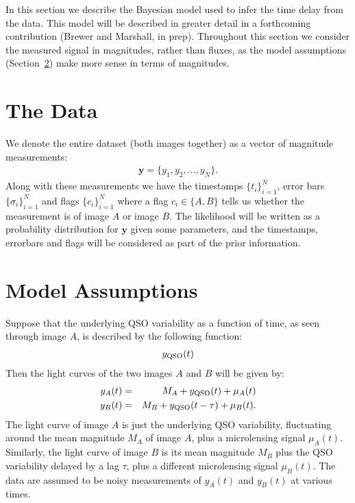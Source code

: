 \documentclass[a4paper, 10pt]{article}
\title{}
\author{}
\date{} %
\newcommand{\yy}{\mathbf{y}}
\begin{document}
In this section we describe the Bayesian model used to infer the
time delay from the data. This model will be described in greater detail in
a forthcoming contribution (Brewer and Marshall, in prep).
Throughout this section we consider the measured signal in magnitudes,
rather than fluxes, as the model assumptions (Section~\ref{sec:assumptions})
make more sense in terms of magnitudes.

\section{The Data}
We denote the entire dataset (both images together)
as a vector of magnitude measurements:
\begin{eqnarray}
\yy = \{y_1, y_2, ..., y_N\}.
\end{eqnarray}
Along with these measurements we have the timestamps $\{t_i\}_{i=1}^N$,
error bars $\{\sigma_i\}_{i=1}^N$ and flags
$\{c_i\}_{i=1}^N$ where a flag $c_i \in \{A, B\}$ tells us whether the
measurement is of image $A$ or image $B$. The likelihood will be
written as a probability distribution for $\yy$ given some parameters, and the
timestamps, errorbars and flags will be considered as part of the prior
information.

\section{Model Assumptions}\label{sec:assumptions}
Suppose that the underlying QSO variability as a function
of time, as seen through image $A$, is described by the following function:
\begin{eqnarray}
y_{\rm QSO}(t)
\end{eqnarray}
Then the light curves of the two images
$A$ and $B$ will be given by:
\begin{eqnarray}
y_A(t) &=& M_A + y_{\rm QSO}(t) + \mu_A(t)\\
y_B(t) &=& M_B + y_{\rm QSO}(t - \tau) + \mu_B(t).
\end{eqnarray}
The light curve of image $A$ is just the underlying QSO variability,
fluctuating around the mean magnitude $M_A$ of image $A$, plus
a microlensing signal $\mu_A(t)$. Similarly,
the light curve of image $B$ is its mean magnitude $M_B$ plus the QSO
variability delayed by a lag $\tau$, plus a different microlensing
signal $\mu_B(t)$. The data are assumed to be noisy measurements of $y_A(t)$ and
$y_B(t)$ at various times.
\end{document}
